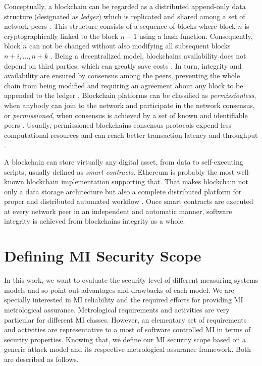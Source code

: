 \documentclass[conference]{IEEEtran}
\begin{document}
Conceptually, a blockchain can be regarded as a distributed append-only data structure (designated as \emph{ledger}) which is replicated and shared among a set of network peers \cite{Christidis2016}. This structure consists of a sequence of blocks where block $n$ is cryptographically linked to the block $n-1$ using a hash function. Consequently, block $n$ can not be changed without also modifying all subsequent blocks $n + i, ..., n + k$ \cite{Sousa2017}. Being a decentralized model, blockchains availability does not depend on third parties, which can greatly save costs \cite{Zheng2017}. In turn, integrity and availability are ensured by consensus among the peers, preventing the whole chain from being modified and requiring an agreement about any block to be appended to the ledger \cite{Sousa2017,Vukolic2016}. Blockchain platforms can be classified as \emph{permissionless}, when anybody can join to the network and participate in the network consensus, or \emph{permissioned}, when consensus is achieved by a set of known and identifiable peers \cite{Vukolic2016,Vukolic2017a}. Usually, permissioned blockchains consensus protocols expend less computational resources and can reach better transaction latency and throughput \cite{Sousa2017}.

A blockchain can store virtually any digital asset, from data to self-executing scripts, usually defined as \emph{smart contracts}. Ethereum \cite{Christidis2016} is probably the most well-known blockchain implementation supporting that. That makes blockchain not only a data storage architecture but also a complete distributed platform for proper and distributed automated workflow \cite{Christidis2016}. Once smart contracts are executed at every network peer in an independent and automatic manner, software integrity is achieved from blockchains integrity as a whole. 

\section{Defining MI Security Scope}
In this work, we want to evaluate the security level of different measuring systems models and so point out advantages and drawbacks of each model. We are specially interested in MI reliability and the required efforts for providing MI metrological assurance. Metrological requirements and activities are very particular for different MI classes. However, an elementary set of requirements and activities are representative to a most of software controlled MI in terms of security properties. Knowing that, we define our MI security scope based on a generic attack model and its respective metrological assurance framework. Both are described as follows. %
\end{document}
